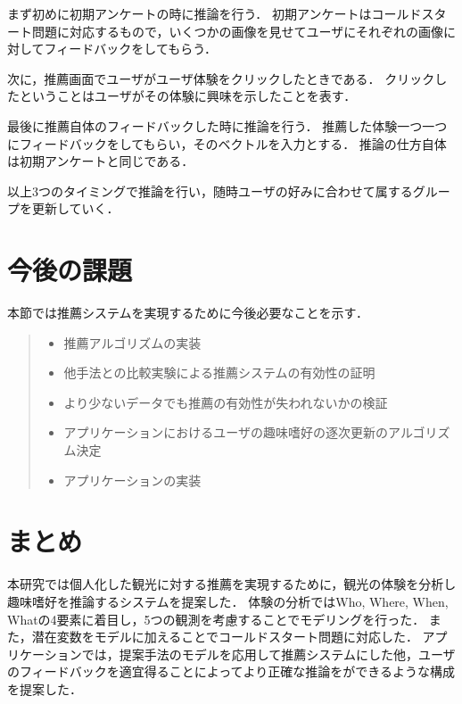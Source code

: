 \documentclass[a4j,10pt, twocolumn]{jarticle}
\begin{document}
まず初めに初期アンケートの時に推論を行う．
初期アンケートはコールドスタート問題に対応するもので，いくつかの画像を見せてユーザにそれぞれの画像に対してフィードバックをしてもらう．

次に，推薦画面でユーザがユーザ体験をクリックしたときである．
クリックしたということはユーザがその体験に興味を示したことを表す．


最後に推薦自体のフィードバックした時に推論を行う．
推薦した体験一つ一つにフィードバックをしてもらい，そのベクトルを入力とする．
推論の仕方自体は初期アンケートと同じである．

以上3つのタイミングで推論を行い，随時ユーザの好みに合わせて属するグループを更新していく．

\section{今後の課題} \label{future_work}
本節では推薦システムを実現するために今後必要なことを示す．

\begin{quote}
  \begin{itemize}
    \item 推薦アルゴリズムの実装
    \item 他手法との比較実験による推薦システムの有効性の証明
    \item より少ないデータでも推薦の有効性が失われないかの検証
    \item アプリケーションにおけるユーザの趣味嗜好の逐次更新のアルゴリズム決定
    \item アプリケーションの実装
  \end{itemize}
\end{quote}

\section{まとめ} \label{summary}
本研究では個人化した観光に対する推薦を実現するために，観光の体験を分析し趣味嗜好を推論するシステムを提案した．
体験の分析ではWho, Where, When, Whatの4要素に着目し，5つの観測を考慮することでモデリングを行った．
また，潜在変数をモデルに加えることでコールドスタート問題に対応した．
アプリケーションでは，提案手法のモデルを応用して推薦システムにした他，ユーザのフィードバックを適宜得ることによってより正確な推論をができるような構成を提案した．



\end{document}
